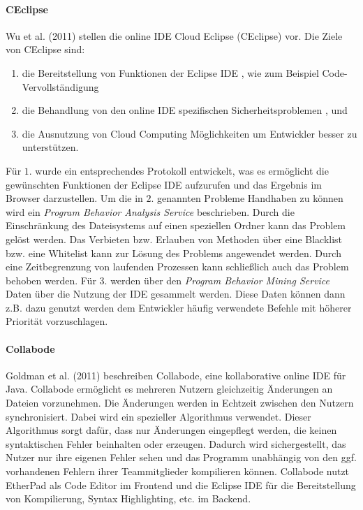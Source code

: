 \paragraph{CEclipse}
Wu et al. (2011) \cite{wu_ceclipse_2011} stellen die online IDE Cloud Eclipse (CEclipse) vor. Die Ziele von CEclipse sind:
\begin{enumerate}
    \item die Bereitstellung von Funktionen der Eclipse IDE \cite{noauthor_eclipse_nodate}, wie zum Beispiel Code-Vervollständigung
    \item die Behandlung von den online IDE spezifischen Sicherheitsproblemen ,  und 
    \item die Ausnutzung von Cloud Computing Möglichkeiten um Entwickler besser zu unterstützen.
\end{enumerate}
Für $1.$ wurde ein entsprechendes Protokoll entwickelt, was es ermöglicht die gewünschten Funktionen der Eclipse IDE aufzurufen und das Ergebnis im Browser darzustellen. Um die in $2.$ genannten Probleme Handhaben zu können wird ein \textit{Program Behavior Analysis Service} beschrieben. Durch die Einschränkung des Dateisystems auf einen speziellen Ordner kann das Problem  gelöst werden. Das Verbieten bzw. Erlauben von Methoden über eine Blacklist bzw. eine Whitelist kann zur Lösung des Problems  angewendet werden. Durch eine Zeitbegrenzung von laufenden Prozessen kann schließlich auch das Problem  behoben werden. Für $3.$ werden über den \textit{Program Behavior Mining Service} Daten über die Nutzung der IDE gesammelt werden. Diese Daten können dann z.B. dazu genutzt werden dem Entwickler häufig verwendete Befehle mit höherer Priorität vorzuschlagen.

\paragraph{Collabode}
Goldman et al. (2011) \cite{goldman_real-time_2011} beschreiben Collabode, eine kollaborative online IDE für Java. Collabode ermöglicht es mehreren Nutzern gleichzeitig Änderungen an Dateien vorzunehmen. Die Änderungen werden in Echtzeit zwischen den Nutzern synchronisiert. Dabei wird ein spezieller Algorithmus verwendet. Dieser Algorithmus sorgt dafür, dass nur Änderungen eingepflegt werden, die keinen syntaktischen Fehler beinhalten oder erzeugen. Dadurch wird sichergestellt, das Nutzer nur ihre eigenen Fehler sehen und das Programm unabhängig von den ggf. vorhandenen Fehlern ihrer Teammitglieder kompilieren können. Collabode nutzt EtherPad \cite{noauthor_etherpad_nodate} als Code Editor im Frontend und die Eclipse IDE \cite{noauthor_eclipse_nodate} für die Bereitstellung von Kompilierung, Syntax Highlighting, etc. im Backend.

